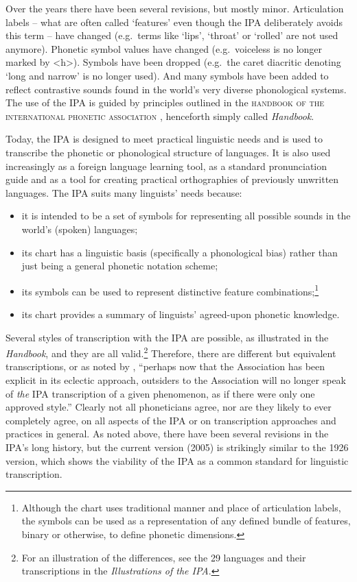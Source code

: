 Over the years there have been several revisions, but mostly minor. Articulation 
labels -- what are often called `features' even though the IPA
deliberately avoids this term -- have changed (e.g.\ terms like `lips', `throat'
or `rolled' are not used anymore). Phonetic symbol values have changed (e.g.\
voiceless is no longer marked by <h>). Symbols have been dropped (e.g.\ the
caret diacritic denoting `long and narrow' is no longer used). And many symbols
have been added to reflect contrastive sounds found in the world's very diverse
phonological systems. The use of the IPA is guided by principles outlined in 
the \textsc{handbook of the international phonetic association} \citep{IPA1999}, 
henceforth simply called \textit{Handbook}. 

Today, the IPA is designed to meet practical linguistic needs and is used to
transcribe the phonetic or phonological structure of languages. It is also used
increasingly as a foreign language learning tool, as a standard pronunciation
guide and as a tool for creating practical orthographies of previously unwritten
languages. The IPA suits many linguists' needs because:

\begin{itemize}

	\item it is intended to be a set of symbols for representing all possible
       sounds in the world's (spoken) languages;
	\item its chart has a linguistic basis (specifically a phonological bias)
       rather than just being a general phonetic notation scheme;
	\item its symbols can be used to represent distinctive feature
       combinations;\footnote{Although the chart uses traditional manner and
       place of articulation labels, the symbols can be used as a representation
       of any defined bundle of features, binary or otherwise, to define
       phonetic dimensions.}
	\item its chart provides a summary of linguists' agreed-upon phonetic 
	knowledge.

\end{itemize}

Several styles of transcription with the IPA are possible, as illustrated in the
\textit{Handbook}, and they are all valid.\footnote{For an illustration of
the differences, see the 29 languages and their transcriptions in the
\textit{Illustrations of the IPA}\citep[41--154]{IPA2007}.} Therefore, there are 
different but equivalent transcriptions, or as noted by \citet[64]{Ladefoged1990a}, 
``perhaps now that the Association has been explicit in its eclectic approach, outsiders to the
Association will no longer speak of \textit{the} IPA transcription of a given
phenomenon, as if there were only one approved style.'' Clearly not all
phoneticians agree, nor are they likely to ever completely agree, on all aspects of the
IPA or on transcription approaches and practices in general. As noted above, 
there have been several revisions in the IPA's long history, but the current version (2005) is
strikingly similar to the 1926 version, which shows the viability of the IPA as a
common standard for linguistic transcription.

